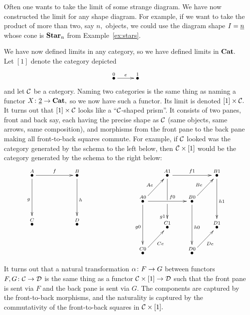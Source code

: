 \documentclass[CT4S-EN-RU]{subfiles}
\begin{document}
\begin{exampleENG}
Often one wants to take the limit of some strange diagram. We have now constructed the limit for any shape diagram. For example, if we want to take the product of more than two, say $n,$ objects, we could use the diagram shape $I=\underline{n}$ whose cone is ${\mathbf{Star}}_n$ from Example~\ref{ex:stars}.
\end{exampleENG}

\begin{exampleRUS}
\end{exampleRUS}

\begin{exampleENG}\label{ex:product version of nat trans}
We have now defined limits in any category, so we have defined limits in ${\mathbf{Cat}}.$ Let $[1]$ denote the category depicted 
$$\xymatrix{\LMO{0}\ar[r]^e&\LMO{1}}$$
and let $\mathcal{C}$ be a category. Naming two categories is the same thing as naming a functor $X\colon\underline{2}\rightarrow{\mathbf{Cat}},$ so we now have such a functor. Its limit is denoted $[1]\times\mathcal{C}.$ It turns out that $[1]\times\mathcal{C}$ looks like a “$\mathcal{C}$-shaped prism”. It consists of two panes, front and back say, each having the precise shape as $\mathcal{C}$ (same objects, same arrows, same composition), and morphisms from the front pane to the back pane making all front-to-back squares commute. For example, if $\mathcal{C}$ looked was the category generated by the schema to the left below, then $\mathcal{C}\times[1]$ would be the category generated by the schema to the right below:
$$
\xymatrix{
\LMO{A}\ar[rr]^f\ar[dd]_g&&\LMO{B}\ar[dd]^h\\\\\LMO{C}&&\LMO{D}
}
\hspace{1in}
\xymatrix@=20pt{
&\LMO{A1}\ar[rr]^{f1}\ar'[d][dd]_(.6){g1}&&\LMO{B1}\ar[dd]^{h1}\\
\LMO{A0}\ar[ur]^{Ae}\ar[rr]^(.6){f0}\ar[dd]_{g0}&&\LMO{B0}\ar[ur]^{Be}\ar[dd]^{h0}\\
&\LMO{C1}&&\LMO{D1}\\
\LMO{C0}\ar[ur]_{Ce}&&\LMO{D0}\ar[ur]_{De}&
}
$$

It turns out that a natural transformation $\alpha\colon F\rightarrow G$ between functors $F,G\colon\mathcal{C}\rightarrow\mathcal{D}$ is the same thing as a functor $\mathcal{C}\times[1]\rightarrow\mathcal{D}$ such that the front pane is sent via $F$ and the back pane is sent via $G.$ The components are captured by the front-to-back morphisms, and the naturality is captured by the commutativity of the front-to-back squares in $\mathcal{C}\times[1].$
\end{exampleENG}
\end{document}
